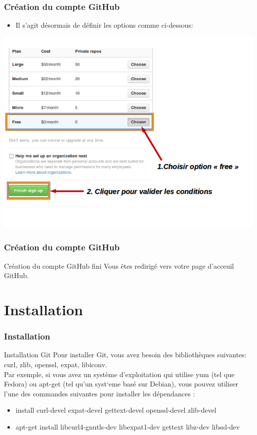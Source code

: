 \documentclass{beamer}
\begin{document}
\begin{frame}
\frametitle{Cr\'eation du compte GitHub}
\begin{itemize}
\item Il s'agit d\'{e}sormais de d\'{e}finir les options comme ci-dessous:
\end{itemize}
\includegraphics[scale=0.3]{GitHubfininsc.png}
\end{frame}

\begin{frame}
\frametitle{Cr\'eation du compte GitHub}
\begin{block}{Cr\'eation du compte GitHub fini}
Vous \^{e}tes redirigé vers votre page d'acceuil GitHub.
\end{block}
\end{frame}

\section{Installation}
\begin{frame}
\frametitle{Installation}
\begin{block}{Installation Git}
Pour installer Git, vous avez besoin des biblioth\`{e}ques suivantes: curl, zlib, openssl, expat, libiconv.\\ Par exemple, si vous avez un syst\`{e}me d'exploitation qui utilise yum (tel que Fedora) ou apt-get (tel qu'un syst`{e}me bas\'{e} sur Debian), vous pouvez utiliser l'une des commandes suivantes pour installer les d\'{e}pendances :
\begin{itemize}
\item install curl-devel expat-devel gettext-devel 
  openssl-devel zlib-devel

\item apt-get install libcurl4-gnutls-dev libexpat1-dev gettext 
  libz-dev libssl-dev
\end{itemize}
\end{block}
\end{frame}
\end{document}
